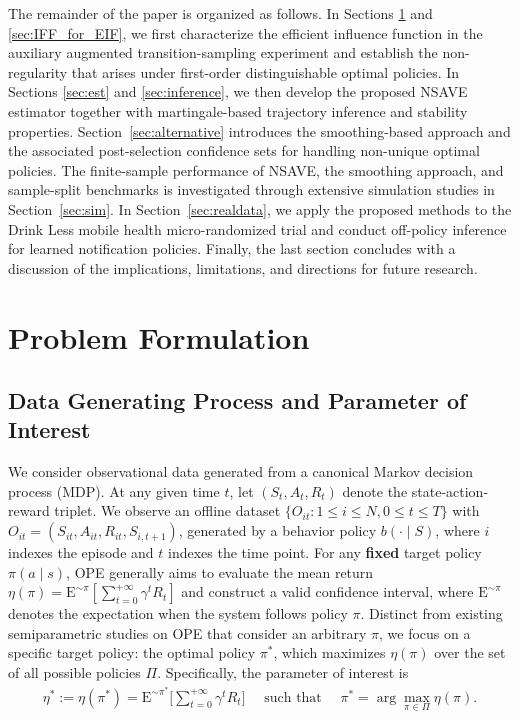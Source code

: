 \documentclass[12pt]{article}
\theoremstyle{remark}\newtheorem{remark}[theorem]{Remark}\theoremstyle{plain}
\newcommand{\E}{\mathrm{E}}
\begin{document}
The remainder of the paper is organized as follows. 
In Sections \ref{sec:setup} and \ref{sec:IFF_for_EIF}, we first
characterize the efficient influence function in the auxiliary
augmented transition-sampling experiment and establish the
non-regularity that arises under first-order distinguishable optimal
policies.
In Sections \ref{sec:est} and \ref{sec:inference}, we then develop the
proposed NSAVE estimator together with martingale-based trajectory
inference and stability properties.
Section~\ref{sec:alternative} introduces the smoothing-based approach and the associated post-selection confidence sets for handling non-unique optimal policies. 
The finite-sample performance of NSAVE, the smoothing approach, and sample-split benchmarks is investigated through extensive simulation studies in Section~\ref{sec:sim}.
In Section~\ref{sec:realdata}, we apply the proposed methods to the Drink Less mobile health micro-randomized trial and conduct off-policy inference for learned notification policies.
Finally, the last section concludes with a discussion of the implications, limitations, and directions for future research.

\section{Problem Formulation}\label{sec:setup}

\subsection{Data Generating Process and Parameter of Interest}

We consider observational data generated from a canonical Markov decision process (MDP).
At any given time $t$, let $(S_t, A_t, R_t)$ denote the state-action-reward triplet.
We observe an offline dataset 
$\big\{ O_{it}: 1 \leq i \leq N, 0 \leq t \leq T\big\}$ with 
$O_{it} = (S_{it}, A_{it}, R_{it},S_{i,t+1})$,
generated by a behavior policy $b(\cdot \mid S)$, where $i$ indexes the episode and $t$ indexes the time point.
For any \textbf{fixed} target policy $\pi(a \mid s)$, OPE generally aims to evaluate the mean return 
$
    \eta(\pi) = \E^{\sim \pi} \left[ \sum_{t = 0}^{+\infty} \gamma^t R_t \right]
$
and construct a valid confidence interval,
where $\E^{\sim \pi}$ denotes the expectation when the system follows policy $\pi$. 
Distinct from existing semiparametric studies on OPE that consider an arbitrary $\pi$, we focus on a specific target policy: the optimal policy $\pi^*$, which maximizes $\eta(\pi)$ over the set of all possible policies $\Pi$. Specifically, the parameter of interest is
\[
     \begin{aligned}
         \eta^* := \eta(\pi^*) = \E^{\sim \pi^*} \bigg[ \sum_{t = 0}^{+\infty} \gamma^t R_t \bigg]\quad \text{ such that } \quad  \pi^* = \arg\max_{\pi \in \Pi} \eta(\pi).
     \end{aligned}
\]
\end{document}
